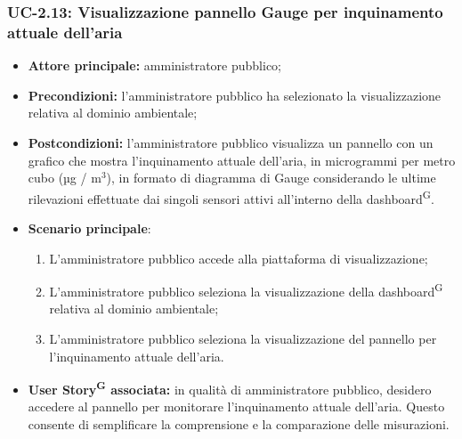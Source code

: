 \documentclass[8pt]{article}
\newcommand{\glossterm}[1]{#1\textsuperscript{G}} %
\begin{document}
\subsubsection*{UC-2.13: Visualizzazione pannello Gauge per inquinamento attuale dell'aria}
\begin{itemize}
    \item \textbf{Attore principale:} amministratore pubblico;
    \item \textbf{Precondizioni:} l'amministratore pubblico ha selezionato la visualizzazione
        relativa al dominio ambientale;
    \item \textbf{Postcondizioni:} l'amministratore pubblico visualizza un pannello con un grafico che mostra l'inquinamento attuale dell'aria, in microgrammi per metro cubo (µg / $\mbox{m}^{\mbox{3}}$), in formato di diagramma di Gauge considerando le ultime rilevazioni effettuate dai singoli sensori attivi all'interno della \glossterm{dashboard}.
    \item \textbf{Scenario principale}:
    \begin{enumerate}
    \item L'amministratore pubblico accede alla piattaforma di visualizzazione;
    \item L'amministratore pubblico seleziona la visualizzazione della \glossterm{dashboard} relativa al dominio
        ambientale; 
    \item L'amministratore pubblico seleziona la visualizzazione del pannello per l'inquinamento attuale dell'aria.
    \end{enumerate}
\item \textbf{\glossterm{User Story} associata:} in qualità di amministratore pubblico, desidero accedere al pannello per monitorare l'inquinamento attuale dell'aria. Questo consente di semplificare la comprensione e la comparazione delle misurazioni.
\end{itemize}
\end{document}
